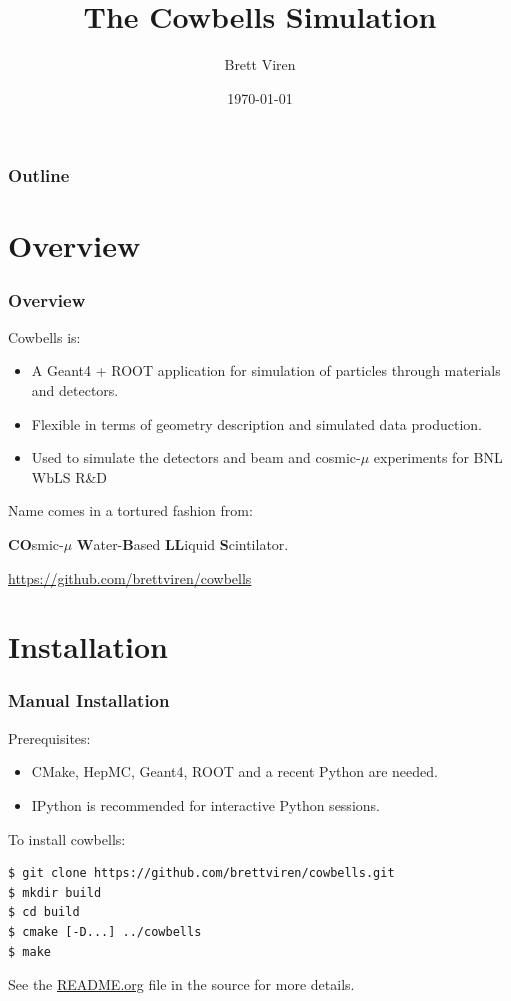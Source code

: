 \documentclass[xcolor=dvipsnames]{beamer}
\title[cowbells]{The Cowbells Simulation}
\institute[BNL]
{
  Physics Department
  
  \texttt{[image: bnl-logo]}
}
\author{Brett Viren}
\date{\today}
\begin{document}
\begin{frame}
\titlepage
\end{frame}

\begin{frame}
  \frametitle{Outline}

  \tableofcontents
\end{frame}

\section{Overview}

\begin{frame}
  \frametitle{Overview}
  
  Cowbells is:
  \begin{itemize}
  \item A Geant4 + ROOT application for simulation of particles through materials and detectors.
  \item Flexible in terms of geometry description and simulated data production.
  \item Used to simulate the detectors and beam and cosmic-$\mu$ experiments for BNL WbLS R\&D
  \end{itemize}

  Name comes in a tortured fashion from: 

  \begin{center}
    \textbf{CO}smic-$\mu$ \textbf{W}ater-\textbf{B}ased \textbf{LL}iquid \textbf{S}cintilator.
  \end{center}
  
  \begin{center}
    \url{https://github.com/brettviren/cowbells}
  \end{center}

\end{frame}

\section{Installation}

\begin{frame}[fragile]
  \frametitle{Manual Installation}

  Prerequisites:
  \begin{itemize}
  \item CMake, HepMC, Geant4, ROOT and a recent Python are needed.
  \item IPython is recommended for interactive Python sessions.
  \end{itemize}


  To install cowbells:

  \begin{lstlisting}[langauge=sh]
$ git clone https://github.com/brettviren/cowbells.git
$ mkdir build
$ cd build
$ cmake [-D...] ../cowbells
$ make
  \end{lstlisting}

  See the \href{https://github.com/brettviren/cowbells/blob/master/README.org}{README.org} file in the source for
  more details.
\end{frame}
\end{document}
